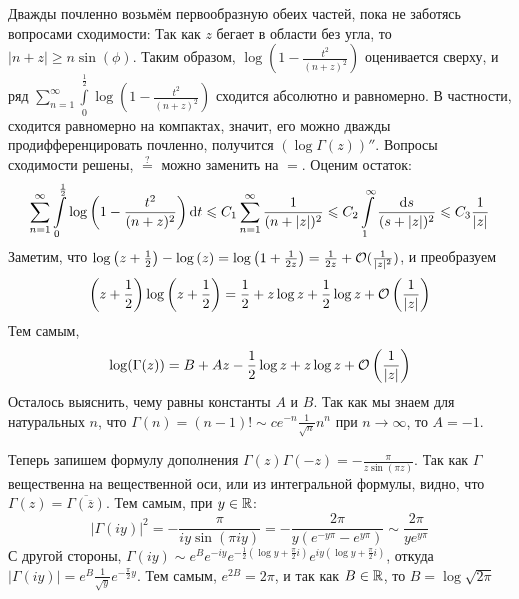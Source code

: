 \documentclass[a4paper]{report}
\begin{document}
{{    Дважды почленно возьмём первообразную обеих частей, пока не заботясь вопросами сходимости:
    Так как $z$ бегает в области без угла, то $|n + z| \ge n\sin(\phi)$.
        Таким образом, $\log\left(1 - \frac{t^2}{(n + z)^2}\right)$ оценивается сверху, и ряд $\sum\limits_{n = 1}^{\infty}\int\limits_{0}^{\frac{1}{2}}\log\left(1 - \frac{t^2}{(n + z)^2}\right)$ сходится абсолютно и равномерно.
        В частности, сходится равномерно на компактах, значит, его можно дважды продифференцировать почленно, получится $(\log \Gamma (z))''$.
        Вопросы сходимости решены, $\overset{?}=$ можно заменить на $=$.
    Оценим остаток:
    \[\sum\limits_{n = 1}^{\infty}\int\limits_{0}^{\frac{1}{2}}\log\left(1 - \frac{t^2}{(n + z)^2}\right)\operatorname{d}\! t \leqslant C_1 \sum\limits_{n = 1}^{\infty}\frac{1}{(n + |z|)^2} \leqslant C_2 \int\limits_1^\infty \frac{\operatorname{d}\! s}{(s + |z|)^2} \leqslant C_3\frac{1}{|z|}\]
        Заметим, что $\log\left(z + \frac{1}{2}\right) - \log\left(z\right) = \log\left(1 + \frac{1}{2z}\right) = \frac{1}{2z}+ \mathcal{O}(\frac{1}{|z|^2})$, и преобразуем
    \[\left(z + \frac{1}{2}\right)\log\left(z + \frac{1}{2}\right) = \frac{1}{2} + z \log z + \frac{1}{2}\log z + \mathcal{O}\left(\frac{1}{|z|}\right)\]
    Тем самым,
    \[\log(\Gamma(z)) = B + Az - \frac{1}{2}\log z + z \log z + \mathcal{O}\left(\frac{1}{|z|}\right)\]
    Осталось выяснить, чему равны константы $A$ и $B$.
    Так как мы знаем для натуральных $n$, что $\Gamma(n) = (n - 1)! \sim c e^{-n}\frac{1}{\sqrt{n}}n^n$ при $n \to \infty$, то $A = -1$.

    Теперь запишем формулу дополнения $\Gamma(z) \Gamma(-z) = -\frac{\pi}{z \sin \left(\pi z\right)}$.
        Так как $\Gamma$ вещественна на вещественной оси, или из интегральной формулы, видно, что $\Gamma(z) = \overline{\Gamma\left(\overline{z}\right)}$.
        Тем самым, при $y \in \mathbb{R}$:
    \[|\Gamma(iy)|^2 = -\frac{\pi}{i y \sin\left(\pi i y\right)} = -\frac{2\pi }{y\left(e^{-y \pi} - e^{y\pi}\right)} \sim \frac{2\pi}{y e^{y\pi}}\]
    С другой стороны, $\Gamma(iy) \sim e^{B}e^{-iy}e^{-\frac{1}{2}\left(\log y + \frac{\pi}{2}i\right)}e^{iy\left(\log y + \frac{\pi}{2}i\right)}$, откуда $|\Gamma(iy)| = e^B \frac{1}{\sqrt{y}}e^{-\frac{\pi}{2}y}$.
        Тем самым, $e^{2B} = 2\pi$, и так как $B \in \mathbb{R}$, то $B = \log\sqrt{2\pi}$
    }
    }
\end{document}
